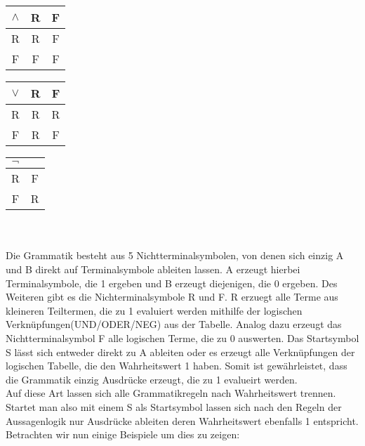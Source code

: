 \documentclass[11pt]{article}
\begin{document}
\\ \ \\
\begin{tabular}[h]{c|cc}
$\wedge$ & R & F \\
\hline
R & R & F\\
F & F & F\\
\end{tabular}
\quad
\begin{tabular}[h]{c|cc}
$\vee$ & R & F \\
\hline
R & R & R\\
F & R & F\\
\end{tabular}
\quad
\begin{tabular}[h]{c|c}
$\neg$ \\
\hline
R & F\\
F & R\\
\end{tabular}
\\ \ \\
Die Grammatik besteht aus 5 Nichtterminalsymbolen, von denen sich einzig A und B direkt auf Terminalsymbole ableiten lassen. A erzeugt hierbei Terminalsymbole, die 1 ergeben und B erzeugt diejenigen, die 0 ergeben. Des Weiteren gibt es die Nichterminalsymbole R und F. R erzuegt alle Terme aus kleineren Teiltermen, die zu 1 evaluiert werden mithilfe der logischen Verknüpfungen(UND/ODER/NEG) aus der Tabelle. Analog dazu erzeugt das Nichtterminalsymbol F alle logischen Terme, die zu 0 auswerten. Das Startsymbol S lässt sich entweder direkt zu A ableiten oder es erzeugt alle Verknüpfungen der logischen Tabelle, die den Wahrheitswert 1 haben. Somit ist gewährleistet, dass die Grammatik einzig Ausdrücke erzeugt, die zu 1 evalueirt werden.   
\\Auf diese Art lassen sich alle Grammatikregeln nach Wahrheitswert trennen. Startet man also mit einem S als Startsymbol lassen sich nach den Regeln der Aussagenlogik nur Ausdrücke ableiten deren Wahrheitswert ebenfalls 1 entspricht.
\\Betrachten wir nun einige Beispiele um dies zu zeigen:
\end{document}
